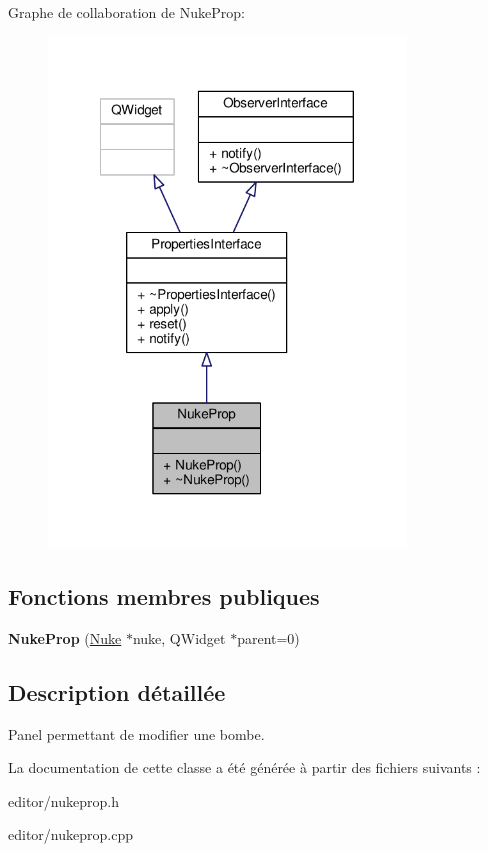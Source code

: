 Graphe de collaboration de Nuke\+Prop\+:\nopagebreak
\begin{figure}[H]
\begin{center}
\leavevmode
\includegraphics[width=269pt]{d0/db8/classNukeProp__coll__graph}
\end{center}
\end{figure}
\subsection*{Fonctions membres publiques}
\begin{DoxyCompactItemize}
\item 
\hypertarget{classNukeProp_a2e11beb43353c8ccbdfe1d8ba7eb61a6}{{\bfseries Nuke\+Prop} (\hyperlink{classNuke}{Nuke} $\ast$nuke, Q\+Widget $\ast$parent=0)}\label{classNukeProp_a2e11beb43353c8ccbdfe1d8ba7eb61a6}

\end{DoxyCompactItemize}


\subsection{Description détaillée}
Panel permettant de modifier une bombe. 

La documentation de cette classe a été générée à partir des fichiers suivants \+:\begin{DoxyCompactItemize}
\item 
editor/nukeprop.\+h\item 
editor/nukeprop.\+cpp\end{DoxyCompactItemize}
